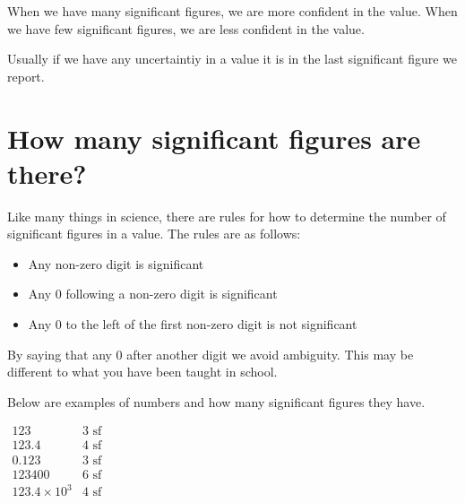 \documentclass[
  letterpaper,
  DIV=11,
  numbers=noendperiod]{scrreprt}
\providecommand{\tightlist}{%
  \setlength{\itemsep}{0pt}\setlength{\parskip}{0pt}}
\newcounter{quartocallouttipno}
\newcommand{\quartocallouttip}[1]{\refstepcounter{quartocallouttipno}\label{#1}}
\begin{document}
When we have many significant figures, we are more confident in the
value. When we have few significant figures, we are less confident in
the value.

Usually if we have any uncertaintiy in a value it is in the last
significant figure we report.

\section{How many significant figures are there?}\label{sec-howmanysf}

Like many things in science, there are rules for how to determine the
number of significant figures in a value. The rules are as follows:

\begin{tcolorbox}[enhanced jigsaw, arc=.35mm, bottomrule=.15mm, bottomtitle=1mm, breakable, colback=white, colbacktitle=quarto-callout-tip-color!10!white, colframe=quarto-callout-tip-color-frame, coltitle=black, left=2mm, leftrule=.75mm, opacityback=0, opacitybacktitle=0.6, rightrule=.15mm, title=\textcolor{quarto-callout-tip-color}{\faLightbulb}\hspace{0.5em}{Tip \ref*{tip-howmanysf}}, titlerule=0mm, toprule=.15mm, toptitle=1mm]

\quartocallouttip{tip-howmanysf} 

\begin{itemize}
\tightlist
\item
  Any non-zero digit is significant
\item
  Any 0 following a non-zero digit is significant
\item
  Any 0 to the left of the first non-zero digit is not significant
\end{itemize}

\end{tcolorbox}

By saying that any 0 after another digit we avoid ambiguity. This may be
different to what you have been taught in school.

Below are examples of numbers and how many significant figures they
have.

\begin{tcolorbox}[enhanced jigsaw, arc=.35mm, bottomrule=.15mm, bottomtitle=1mm, breakable, colback=white, colbacktitle=quarto-callout-caution-color!10!white, colframe=quarto-callout-caution-color-frame, coltitle=black, left=2mm, leftrule=.75mm, opacityback=0, opacitybacktitle=0.6, rightrule=.15mm, title=\textcolor{quarto-callout-caution-color}{\faFire}\hspace{0.5em}{How many significant figures are there?}, titlerule=0mm, toprule=.15mm, toptitle=1mm]

\(\begin{array}{cc}
123 & 3 \textrm{ sf}\\
123.4 & 4 \textrm{ sf}\\
0.123 & 3 \textrm{ sf}\\
123400 & 6 \textrm{ sf}\\
123.4 \times 10^3 & 4 \textrm{ sf}
\end{array}\)

\end{tcolorbox}
\end{document}
